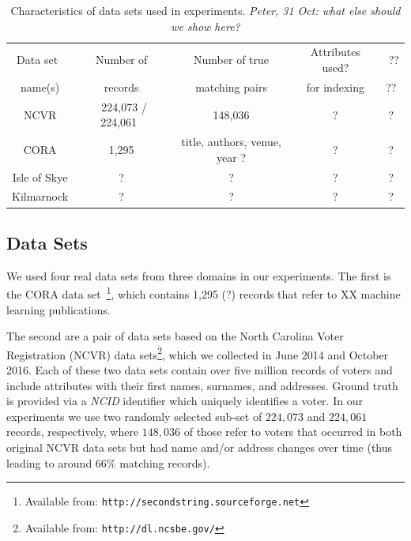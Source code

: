 \documentclass{llncs}
\begin{document}
\begin{table}[t]
\caption{Characteristics of data sets used in experiments.
  \emph{Peter, 31 Oct: what else should we show here?}}
 \label{table-datasets}
  \centering
  \begin{scriptsize}
  \begin{tabular}{ccccc}
  \hline\noalign{\smallskip}
  Data set~ & ~Number of~ & ~Number of true~
   & Attributes used? & ~?? \\
  name(s)  & records   & matching pairs &
    for indexing & ?? \\
  \noalign{\smallskip}
  \hline
  \noalign{\smallskip}
  NCVR  & ~224,073 / 224,061~ & ~148,036~ & ? & ? \\
  CORA  & 1,295             & title, authors, venue, year ? & ?
    & ? \\
  Isle of Skye & ? & ?
    & ? & ? \\
  Kilmarnock  & ? & ? & ? & ? \\
  \hline
  \end{tabular}
  \end{scriptsize}
\end{table}


\subsection{Data Sets}
\label{sec-data}

We used four real data sets from three domains in our experiments. The
first is the CORA data set~\footnote{Available from:
\texttt{http://secondstring.sourceforge.net}}, which contains 1,295
(?) records that refer to XX machine learning publications.

The second are a pair of data sets based on the North Carolina Voter
Registration (NCVR) data sets\footnote{Available from: \texttt{http://dl.ncsbe.gov/}}, which we collected in June 2014 and
October 2016. Each of these two data sets contain over five million
records of voters and include attributes with their first names,
surnames, and addresses. Ground truth is provided via a \emph{NCID}
identifier which uniquely identifies a voter. In our experiments we
use two randomly selected sub-set of $224,073$ and $224,061$ records,
respectively, where $148,036$ of those refer to voters that occurred
in both original NCVR data sets but had name and/or address changes
over time (thus leading to around $66\%$ matching records).
\end{document}
